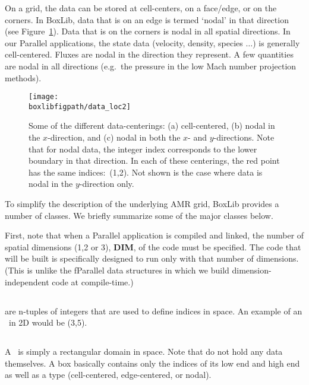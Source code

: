 On a grid, the data can be stored at cell-centers, on a face/edge, or
on the corners.  In BoxLib, data that is on an edge is termed `nodal'
in that direction (see Figure~\ref{fig:dataloc}).  Data that is on the
corners is nodal in all spatial directions.  In our Parallel applications, 
the state data (velocity, density, species $\ldots$) is generally
cell-centered.  Fluxes are nodal in the direction they represent.
A few quantities are nodal in all directions (e.g.\ the pressure in
the low Mach number projection methods).

\begin{figure}[h]
\centering
\texttt{[image: \\boxlibfigpath/data\_loc2]}
\caption[Data-centerings on the grid]
  {\label{fig:dataloc} Some of the different data-centerings:
  (a) cell-centered, (b) nodal in the $x$-direction, and (c) nodal in
  both the $x$- and $y$-directions.  Note that for nodal data, the
  integer index corresponds to the lower boundary in that direction.
  In each of these centerings, the red point has the same indices:\ (1,2).
  Not shown is the case where data is nodal in the $y$-direction only.}
\end{figure}

To simplify the description of the underlying AMR grid, BoxLib
provides a number of classes.  We briefly summarize some of the major
classes below.

First, note that when a Parallel application is compiled and linked,
the number of spatial dimensions (1,2 or 3), {\bf DIM},
 of the code must be specified.  The code that will be
built is specifically designed to run only with that number of dimensions.
(This is unlike the fParallel data structures in which we build
dimension-independent code at compile-time.)

\subsection{\IVtype}

\IVtype\s are n-tuples of integers that are used to define
indices in space.    An example of an \IVtype\ in 2D would
be (3,5).

\subsection{\Boxtype}

A \Boxtype\ is simply a rectangular domain in space.  Note that \Boxtype\s
do not hold any data themselves. A box basically contains
only the indices of its low end and high end as well as a type 
(cell-centered, edge-centered, or nodal).

